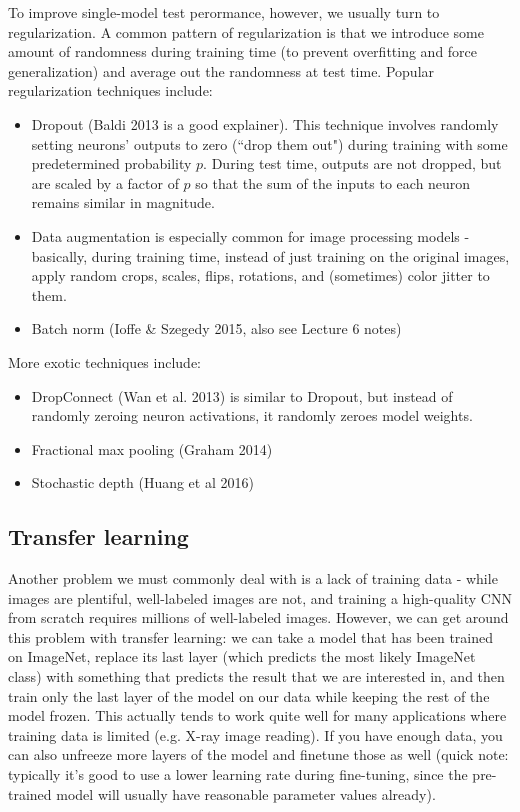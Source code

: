 To improve single-model test perormance, however, we usually turn to regularization. A common pattern of regularization is that we introduce some amount of randomness during training time (to prevent overfitting and force generalization) and average out the randomness at test time. Popular regularization techniques include:
\begin{itemize}
\item Dropout (Baldi 2013 is a good explainer). This technique involves randomly setting neurons' outputs to zero (``drop them out") during training with some predetermined probability $p$. During test time, outputs are not dropped, but are scaled by a factor of $p$ so that the sum of the inputs to each neuron remains similar in magnitude.
\item Data augmentation is especially common for image processing models - basically, during training time, instead of just training on the original images, apply random crops, scales, flips, rotations, and (sometimes) color jitter to them.
\item Batch norm (Ioffe \& Szegedy 2015, also see Lecture 6 notes)
\end{itemize}
More exotic techniques include:
\begin{itemize}
\item DropConnect (Wan et al. 2013) is similar to Dropout, but instead of randomly zeroing neuron activations, it randomly zeroes model weights.
\item Fractional max pooling (Graham 2014)
\item Stochastic depth (Huang et al 2016)
\end{itemize}

\subsection{Transfer learning}
Another problem we must commonly deal with is a lack of training data - while images are plentiful, well-labeled images are not, and training a high-quality CNN from scratch requires millions of well-labeled images. However, we can get around this problem with transfer learning: we can take a model that has been trained on ImageNet, replace its last layer (which predicts the most likely ImageNet class) with something that predicts the result that we are interested in, and then train only the last layer of the model on our data while keeping the rest of the model frozen. This actually tends to work quite well for many applications where training data is limited (e.g. X-ray image reading). If you have enough data, you can also unfreeze more layers of the model and finetune those as well (quick note: typically it's good to use a lower learning rate during fine-tuning, since the pre-trained model will usually have reasonable parameter values already).
